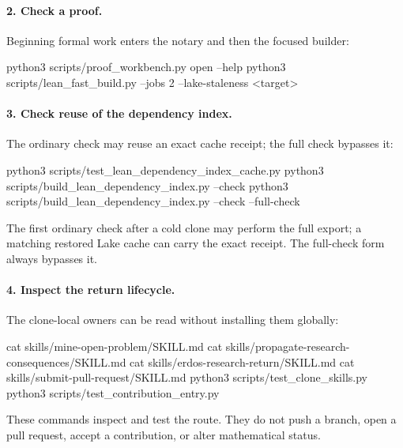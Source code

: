 \documentclass[11pt]{article}
\begin{document}
\paragraph{2. Check a proof.}
Beginning formal work enters the notary and then the focused builder:
\begin{routeblock}
python3 scripts/proof_workbench.py open --help
python3 scripts/lean_fast_build.py --jobs 2 --lake-staleness <target>
\end{routeblock}

\paragraph{3. Check reuse of the dependency index.}
The ordinary check may reuse an exact cache receipt; the full check bypasses it:
\begin{routeblock}
python3 scripts/test_lean_dependency_index_cache.py
python3 scripts/build_lean_dependency_index.py --check
python3 scripts/build_lean_dependency_index.py --check --full-check
\end{routeblock}
The first ordinary check after a cold clone may perform the full export; a
matching restored Lake cache can carry the exact receipt. The full-check form
always bypasses it.

\paragraph{4. Inspect the return lifecycle.}
The clone-local owners can be read without installing them globally:
\begin{routeblock}
cat skills/mine-open-problem/SKILL.md
cat skills/propagate-research-consequences/SKILL.md
cat skills/erdos-research-return/SKILL.md
cat skills/submit-pull-request/SKILL.md
python3 scripts/test_clone_skills.py
python3 scripts/test_contribution_entry.py
\end{routeblock}
These commands inspect and test the route. They do not push a branch, open a
pull request, accept a contribution, or alter mathematical status.
\end{document}
